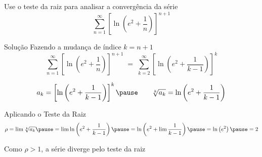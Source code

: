 \begin{question}
  Use o teste da raiz para analisar a convergência da série
  \[
    \sum_{n=1}^\infty \left[\ln\left(e^2+\frac{1}{n}\right)\right]^{n+1}
  \]
\end{question}

\begin{resolution}{Solução}
  Fazendo a mudança de índice \(k=n+1\)
  \[
    \sum_{n=1}^\infty \left[\ln\left(e^2+\frac{1}{n}  \right)\right]^{n+1} \;=\;
    \sum_{k=2}^\infty \left[\ln\left(e^2+\frac{1}{k-1}\right)\right]^{k}
  \]

  \pause
  \[
    a_k
    = \left[\ln\left( e^2 + \frac{1}{k-1} \right)\right]^k
    \pause
    \qquad
    \sqrt[k]{a_k}
    = \ln\left(e^2+\frac{1}{k-1}\right)
  \]

  \pause
  Aplicando o Teste da Raiz
  \[
    \rho
    = \lim \sqrt[k]{a_k}
    \pause
    = \lim \ln\left(e^2+\frac{1}{k-1}\right)
    \pause
    = \ln \left(e^2+ \lim\frac{1}{k-1}\right)
    \pause
    = \ln \left(e^2\right)
    \pause
    = 2
  \]

  Como \(\rho > 1\),
  \pause
  a série diverge pelo teste da raiz
\end{resolution}

